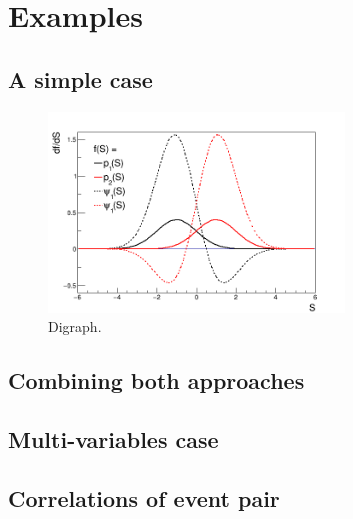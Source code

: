 \section{Examples}
\subsection{A simple case}

\begin{figure}[!htb]
\centering
\includegraphics[width=0.7\textwidth]{../png/figGaus2.png}
\caption{Digraph.}
\label{fig:Gaus2}
\end{figure}

\subsection{Combining both approaches}

\subsection{Multi-variables case}

\subsection{Correlations of event pair}

